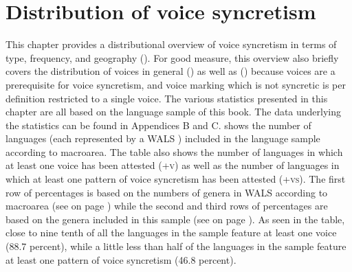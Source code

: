 \chapter{Distribution of voice syncretism} \label{sect:distribution}
This chapter provides a distributional overview of voice syncretism in terms of type, frequency, and geography (). For good measure, this overview also briefly covers the distribution of voices in general () as well as  () because voices are a prerequisite for voice syncretism, and voice marking which is not syncretic is per definition restricted to a single voice. The various statistics presented in this chapter are all based on the language sample of this book. The data underlying the statistics can be found in Appendices B and C.  shows the number of languages (each represented by a WALS ) included in the language sample according to macroarea. The table also shows the number of languages in which at least one voice has been attested (+\textsc{v}) as well as the number of languages in which at least one pattern of voice syncretism has been attested (+\textsc{vs}). The first row of percentages is based on the numbers of genera in WALS according to macroarea (see  on page \pageref{tab:ch1:wals}) while the second and third rows of percentages are based on the genera included in this sample (see  on page \pageref{tab:ch1:sample}). As seen in the table, close to nine tenth of all the languages in the sample feature at least one voice (88.7 percent), while a little less than half of the languages in the sample feature at least one pattern of voice syncretism (46.8 percent).

